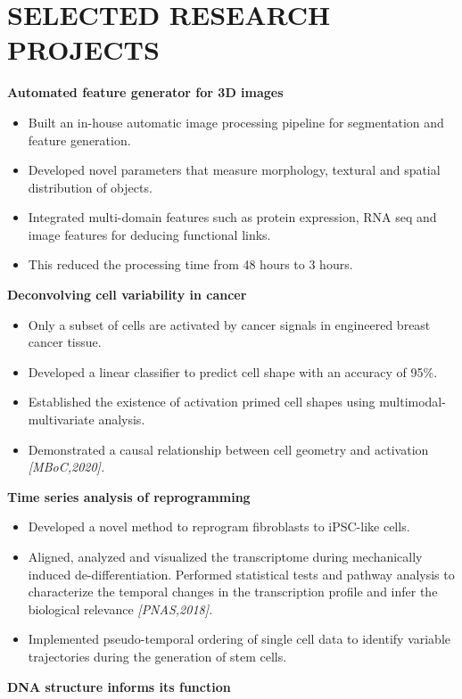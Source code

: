 \documentclass[letterpaper,11pt]{article}
\begin{document}
\section{\bf SELECTED RESEARCH PROJECTS}
{\bf Automated feature generator for 3D images}
\begin{itemize}
    \item Built an in-house automatic image processing pipeline for segmentation and feature generation.
    \item Developed novel parameters that measure morphology, textural and spatial distribution of objects.
     \item Integrated multi-domain features such as protein expression, RNA seq and image features for deducing functional links. 
    \item This reduced the processing time from 48 hours to 3 hours. 
\end{itemize}
\vspace{1mm}
{\bf Deconvolving cell variability in cancer}
\begin{itemize}
    \item Only a subset of cells are activated by cancer signals in engineered breast cancer tissue.
     \item Developed a linear classifier to predict cell shape with an accuracy of 95\%.
     \item Established the existence of activation primed cell shapes using multimodal-multivariate analysis.
    \item Demonstrated a causal relationship between cell geometry and activation \em {[MBoC,2020]}.
\end{itemize}
\vspace{1mm}
{\bf Time series analysis of reprogramming}
\begin{itemize}
    \item Developed a novel method to reprogram fibroblasts to iPSC-like cells.
    \item Aligned, analyzed and visualized the transcriptome during mechanically induced de-differentiation. Performed statistical tests and pathway analysis to characterize the temporal changes in the transcription profile and infer the biological relevance \em {[PNAS,2018]}.
    \item Implemented pseudo-temporal ordering of single cell data to identify variable trajectories during the generation of stem cells. 
\end{itemize}
\vspace{1mm}
{\bf DNA structure informs its function}
\end{document}
